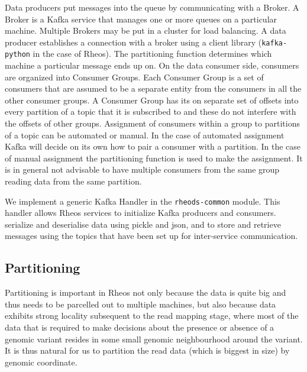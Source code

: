 Data producers put messages into the queue by communicating with a Broker. A Broker is a Kafka service that manages one or more queues on a particular machine. Multiple Brokers may be put in a cluster for load balancing. A data producer establishes a connection with a broker using a client library (\texttt{kafka-python} in the case of Rheos). The partitioning function determines which machine a particular message ends up on.
\newpage
On the data consumer side, consumers are organized into Consumer Groups. Each Consumer Group is a set of consumers that are assumed to be a separate entity from the consumers in all the other consumer groups. A Consumer Group has its on separate set of offsets into every partition of a topic that it is subscribed to and these do not interfere with the offsets of other groups. Assignment of consumers within a group to partitions of a topic can be automated or manual. In the case of automated assignment Kafka will decide on its own how to pair a consumer with a partition. In the case of manual assignment the partitioning function is used to make the assignment. It is in general not advisable to have multiple consumers from the same group reading data from the same partition. 

We implement a generic Kafka Handler in the \texttt{rheods-common} module. This handler allows Rheos services to initialize Kafka producers and consumers. serialize and deserialise data using pickle and json, and to store and retrieve messages using the topics that have been set up for inter-service communication.

\subsection{Partitioning} \label{sec:main_body_partitioning}

Partitioning is important in Rheos not only because the data is quite big and thus needs to be parcelled out to multiple machines, but also because data exhibits strong locality subsequent to the read mapping stage, where most of the data that is required to make decisions about the presence or absence of a genomic variant resides in some small genomic neighbourhood around the variant. It is thus natural for us to partition the read data (which is biggest in size) by genomic coordinate.

